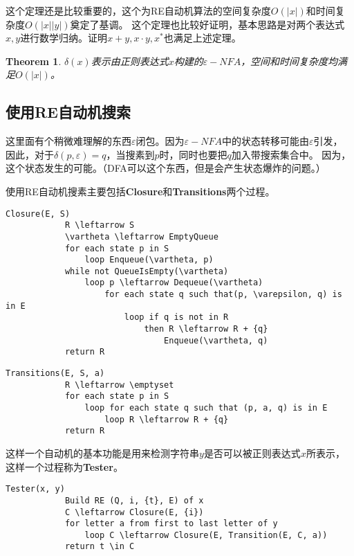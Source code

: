 \documentclass[UTF8]{ctexart}
\newtheorem{thm}{Theorem}[subsection]
\theoremstyle{definition}
\theoremstyle{remark}
\numberwithin{equation}{subsection}
\newcommand\Emph{\textbf}
\begin{document}
	这个定理还是比较重要的，这个为RE自动机算法的空间复杂度$O(|x|)$和时间复杂度$O(|x||y|)$奠定了基调。
	这个定理也比较好证明，基本思路是对两个表达式$x,y$进行数学归纳。证明$x+y, x \cdot y, x^*$也满足上述定理。
	
	\begin{thm}
		$\delta(x)$表示由正则表达式$x$构建的$\varepsilon-NFA$，空间和时间复杂度均满足$O(|x|)$。
	\end{thm}
	
\subsection{使用RE自动机搜索}

	这里面有个稍微难理解的东西$\varepsilon 闭包$。因为$\varepsilon-NFA$中的状态转移可能由$\varepsilon$引发，
	因此，对于$\delta(p,\varepsilon) = q$，当搜素到$p$时，同时也要把$q$加入带搜索集合中。
	因为，这个状态发生的可能。（DFA可以这个东西，但是会产生状态爆炸的问题。）
	
	使用RE自动机搜素主要包括\Emph{Closure}和\Emph{Transitions}两个过程。
	\begin{lstlisting}[frame=shadowbox,framexleftmargin=5mm,rulesepcolor=\color{gray},numbers=none]
		Closure(E, S)
			R \leftarrow S
			\vartheta \leftarrow EmptyQueue
			for each state p in S
				loop Enqueue(\vartheta, p)
			while not QueueIsEmpty(\vartheta)
				loop p \leftarrow Dequeue(\vartheta)
					for each state q such that(p, \varepsilon, q) is in E
						loop if q is not in R
							then R \leftarrow R + {q}
								Enqueue(\vartheta, q)
			return R
	\end{lstlisting}
	\begin{lstlisting}[frame=shadowbox,framexleftmargin=5mm,rulesepcolor=\color{gray},numbers=none]
		Transitions(E, S, a)
			R \leftarrow \emptyset
			for each state p in S
				loop for each state q such that (p, a, q) is in E
					loop R \leftarrow R + {q}
			return R
	\end{lstlisting}
	
	这样一个自动机的基本功能是用来检测字符串$y$是否可以被正则表达式$x$所表示，这样一个过程称为\Emph{Tester}。
	\begin{lstlisting}[frame=shadowbox,framexleftmargin=5mm,rulesepcolor=\color{gray},numbers=none]
		Tester(x, y)
			Build RE (Q, i, {t}, E) of x
			C \leftarrow Closure(E, {i})
			for letter a from first to last letter of y
				loop C \leftarrow Closure(E, Transition(E, C, a))
			return t \in C
	\end{lstlisting}
	
\end{document}
